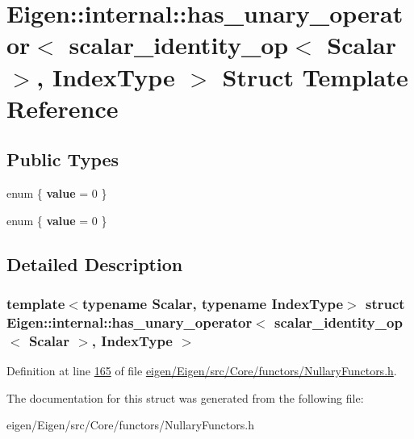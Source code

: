 \hypertarget{struct_eigen_1_1internal_1_1has__unary__operator_3_01scalar__identity__op_3_01_scalar_01_4_00_01_index_type_01_4}{}\section{Eigen\+:\+:internal\+:\+:has\+\_\+unary\+\_\+operator$<$ scalar\+\_\+identity\+\_\+op$<$ Scalar $>$, Index\+Type $>$ Struct Template Reference}
\label{struct_eigen_1_1internal_1_1has__unary__operator_3_01scalar__identity__op_3_01_scalar_01_4_00_01_index_type_01_4}
\subsection*{Public Types}
\begin{DoxyCompactItemize}
\item 
\mbox{\label{struct_eigen_1_1internal_1_1has__unary__operator_3_01scalar__identity__op_3_01_scalar_01_4_00_01_index_type_01_4_a28306dba37c6211be5e2a4a16b6d55a4}} 
enum \{ {\bfseries value} = 0
 \}
\item 
\mbox{\label{struct_eigen_1_1internal_1_1has__unary__operator_3_01scalar__identity__op_3_01_scalar_01_4_00_01_index_type_01_4_a96432fd516d77487cec67795860111d7}} 
enum \{ {\bfseries value} = 0
 \}
\end{DoxyCompactItemize}


\subsection{Detailed Description}
\subsubsection*{template$<$typename Scalar, typename Index\+Type$>$\newline
struct Eigen\+::internal\+::has\+\_\+unary\+\_\+operator$<$ scalar\+\_\+identity\+\_\+op$<$ Scalar $>$, Index\+Type $>$}



Definition at line \hyperlink{eigen_2_eigen_2src_2_core_2functors_2_nullary_functors_8h_source_l00165}{165} of file \hyperlink{eigen_2_eigen_2src_2_core_2functors_2_nullary_functors_8h_source}{eigen/\+Eigen/src/\+Core/functors/\+Nullary\+Functors.\+h}.



The documentation for this struct was generated from the following file\+:\begin{DoxyCompactItemize}
\item 
eigen/\+Eigen/src/\+Core/functors/\+Nullary\+Functors.\+h\end{DoxyCompactItemize}
